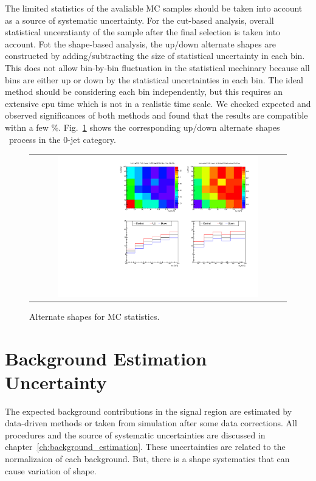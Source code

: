 The limited statistics of the avaliable MC samples should be taken 
into account as a source of systematic uncertainty. 
For the cut-based analysis, overall statistical unceratianty of the sample 
after the final selection is taken into account. 
Fot the shape-based analysis, the up/down alternate shapes are constructed 
by adding/subtracting the size of statistical uncertainty in each bin. 
This does not allow bin-by-bin fluctuation in the statistical mechinary 
because all bins are either up or down by the statistical uncertainties 
in each bin. The ideal method should be considering each bin independently,
but this requires an extensive cpu time which is not in a realistic
time scale. We checked expected and observed significances of both methods 
and found that the results are compatible withn a few \%.  
Fig.~\ref{fig:alter_stat} shows the corresponding up/down alternate shapes
\ggww\ process in the 0-jet category. 
%
\begin{figure}[htp]
\centering
\begin{tabular}{c}
\includegraphics[width=0.8\textwidth]{figures/histo_ggWW_CMS_hww_of_0j_MVAggWWStatBounding_8TeV_0j_zoom.pdf}
\end{tabular}
\caption{Alternate shapes for MC statistics. \ggww }
\label{fig:alter_stat}
\end{figure}



\section{Background Estimation Uncertainty} 

The expected background contributions in the signal region are estimated by 
data-driven methods or taken from simulation after some data corrections.  
All procedures and the source of systematic uncertainties are discussed 
in chapter~\ref{ch:background_estimation}. These uncertainties are related 
to the normalizaion of each background. But, there is a shape systematics 
that can cause variation of shape. 

